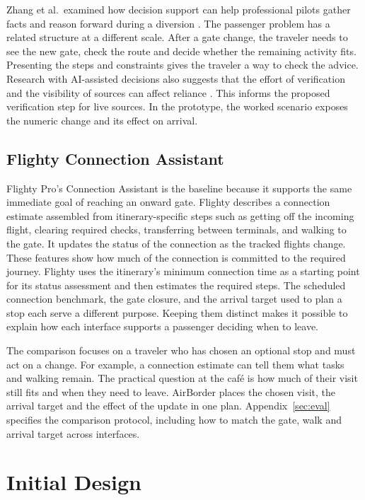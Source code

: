 \documentclass[sigconf,nonacm,balance=false]{acmart}
\begin{document}
Zhang et al.\ examined how decision support can help professional pilots gather facts and reason forward during a diversion \cite{ref221}. The passenger problem has a related structure at a different scale. After a gate change, the traveler needs to see the new gate, check the route and decide whether the remaining activity fits. Presenting the steps and constraints gives the traveler a way to check the advice. Research with AI-assisted decisions also suggests that the effort of verification and the visibility of sources can affect reliance \cite{ref219,ref220}. This informs the proposed verification step for live sources. In the prototype, the worked scenario exposes the numeric change and its effect on arrival.

\subsection{Flighty Connection Assistant}
Flighty Pro's Connection Assistant is the baseline because it supports the same immediate goal of reaching an onward gate. Flighty describes a connection estimate assembled from itinerary-specific steps such as getting off the incoming flight, clearing required checks, transferring between terminals, and walking to the gate. It updates the status of the connection as the tracked flights change. These features show how much of the connection is committed to the required journey. Flighty uses the itinerary's minimum connection time as a starting point for its status assessment and then estimates the required steps. The scheduled connection benchmark, the gate closure, and the arrival target used to plan a stop each serve a different purpose. Keeping them distinct makes it possible to explain how each interface supports a passenger deciding when to leave.

The comparison focuses on a traveler who has chosen an optional stop and must act on a change. For example, a connection estimate can tell them what tasks and walking remain. The practical question at the caf\'e is how much of their visit still fits and when they need to leave. AirBorder places the chosen visit, the arrival target and the effect of the update in one plan. Appendix~\ref{sec:eval} specifies the comparison protocol, including how to match the gate, walk and arrival target across interfaces.

\section{Initial Design}
\end{document}
